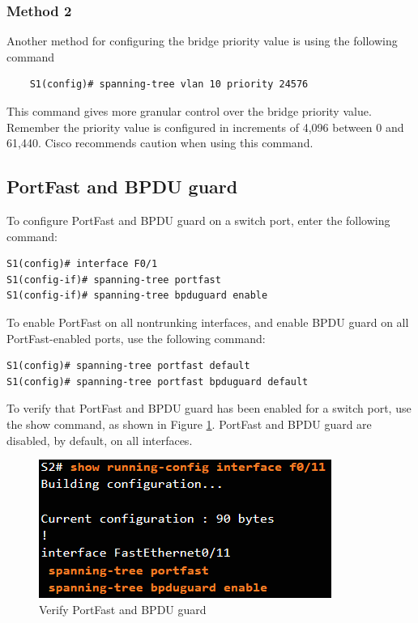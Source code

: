 \subsubsection{Method 2}

Another method for configuring the bridge priority value is using the following command
    \begin{verbatim}
    S1(config)# spanning-tree vlan 10 priority 24576
    \end{verbatim}
This command gives more granular control over the bridge priority value. Remember the priority value is configured in increments of 4,096 between 0 and 61,440. Cisco recommends caution when using this command.   

\subsection{PortFast and BPDU guard} 

To configure PortFast and BPDU guard on a switch port, enter the following command:

\begin{verbatim}
S1(config)# interface F0/1
S1(config-if)# spanning-tree portfast
S1(config-if)# spanning-tree bpduguard enable
\end{verbatim}

To enable PortFast on all nontrunking interfaces, and enable BPDU guard on all PortFast-enabled ports, use the following command:

\begin{verbatim}
S1(config)# spanning-tree portfast default
S1(config)# spanning-tree portfast bpduguard default
\end{verbatim}

To verify that PortFast and BPDU guard has been enabled for a switch port, use the show command, as shown in Figure \ref{VerifyPortFast}. \note PortFast and BPDU guard are disabled, by default, on all interfaces.

\begin{figure}[hbtp]
\caption{Verify PortFast and BPDU guard}\label{VerifyPortFast}
\centering
\includegraphics[scale=0.8]{pictures/VerifyPortFast.PNG}
\end{figure}

